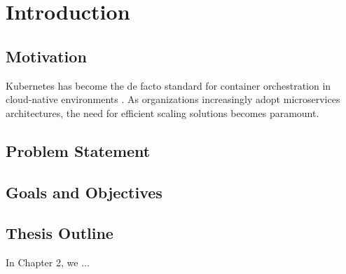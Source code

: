 \chapter{Introduction}
\label{cha:introduction}

\section{Motivation}
Kubernetes has become the de facto standard for container orchestration in cloud-native environments \cite{kubernetes_up_and_running}. As organizations increasingly adopt microservices architectures, the need for efficient scaling solutions becomes paramount.

\section{Problem Statement}

\section{Goals and Objectives}

\section{Thesis Outline}
In Chapter 2, we ... 